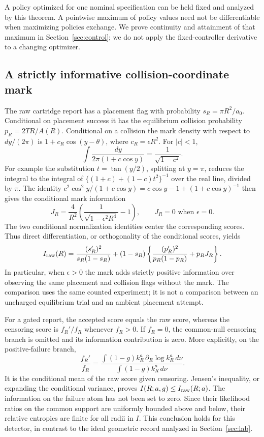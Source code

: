 A policy optimized for one nominal specification can be held fixed and
analyzed by this theorem. A pointwise maximum of policy values need not be
differentiable when maximizing policies exchange. We prove continuity and
attainment of that maximum in Section~\ref{sec:control}; we do not apply
the fixed-controller derivative to a changing optimizer.

\subsection{A strictly informative collision-coordinate mark}
The raw cartridge report has a placement flag with probability
$s_R=\pi R^2/a_0$. Conditional on placement success it has the equilibrium
collision probability $p_R=2TR/A(R)$. Conditional on a collision the mark
density with respect to $dy/(2\pi)$ is $1+c_R\cos(y-\theta)$, where
$c_R=\epsilon R^2$. For $|c|<1$,
\[
 \int\frac{dy}{2\pi(1+c\cos y)}=\frac1{\sqrt{1-c^2}}.
\]
For example the substitution $t=\tan(y/2)$, splitting at $y=\pi$, reduces
the integral to the integral of
$\{(1+c)+(1-c)t^2\}^{-1}$ over the real line, divided by $\pi$.
The identity
$c^2\cos^2y/(1+c\cos y)=c\cos y-1+(1+c\cos y)^{-1}$ then gives the
conditional mark information
\begin{equation}
 J_R=\frac4{R^2}\left(\frac1{\sqrt{1-\epsilon^2R^4}}-1\right),
 \qquad J_R=0\text{ when }\epsilon=0.
 \label{eq:mark-info}
\end{equation}
The two conditional normalization identities center the corresponding
scores. Thus direct differentiation, or orthogonality of the conditional
scores, yields
\begin{equation}
 I_{\rm raw}(R)
 =\frac{(s_R')^2}{s_R(1-s_R)}
 +(1-s_R)\left\{\frac{(p_R')^2}{p_R(1-p_R)}+p_R J_R\right\}.
 \label{eq:raw-info}
\end{equation}
In particular, when $\epsilon>0$ the mark adds strictly positive information
over observing the same placement and collision flags without the mark.
The comparison uses the same counted experiment; it is not a comparison
between an uncharged equilibrium trial and an ambient placement attempt.

For a gated report, the accepted score equals the raw score, whereas the
censoring score is $f_R'/f_R$ whenever $f_R>0$. If $f_R=0$, the
common-null censoring branch is omitted and its information contribution is
zero. More explicitly, on the positive-failure branch,
\[
 \frac{f_R'}{f_R}=\frac{\int(1-g)k_R^a\,\partial_R\log k_R^a\,d\nu}
                       {\int(1-g)k_R^a\,d\nu}.
\]
It is the conditional mean of the raw score given censoring. Jensen's
inequality, or expanding the conditional variance, proves
$I(R;a,g)\le I_{\rm raw}(R;a)$. The information on the failure atom has not
been set to zero. Since their likelihood ratios on the common support are uniformly bounded
above and below, their relative entropies are finite
for all radii in $I$. This conclusion holds for this detector, in contrast
to the ideal geometric record analyzed in Section~\ref{sec:lab}.

